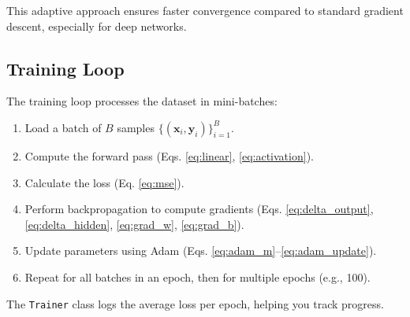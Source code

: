 \documentclass[11pt, a4paper]{article}
\begin{document}
This adaptive approach ensures faster convergence compared to standard gradient descent, especially for deep networks.

\subsection{Training Loop}
The training loop processes the dataset in mini-batches:
\begin{enumerate}
    \item Load a batch of $B$ samples $\{(\mathbf{x}_i, \mathbf{y}_i)\}_{i=1}^B$.
    \item Compute the forward pass (Eqs. \ref{eq:linear}, \ref{eq:activation}).
    \item Calculate the loss (Eq. \ref{eq:mse}).
    \item Perform backpropagation to compute gradients (Eqs. \ref{eq:delta_output}, \ref{eq:delta_hidden}, \ref{eq:grad_w}, \ref{eq:grad_b}).
    \item Update parameters using Adam (Eqs. \ref{eq:adam_m}–\ref{eq:adam_update}).
    \item Repeat for all batches in an epoch, then for multiple epochs (e.g., 100).
\end{enumerate}
The \texttt{Trainer} class logs the average loss per epoch, helping you track progress.
\end{document}
